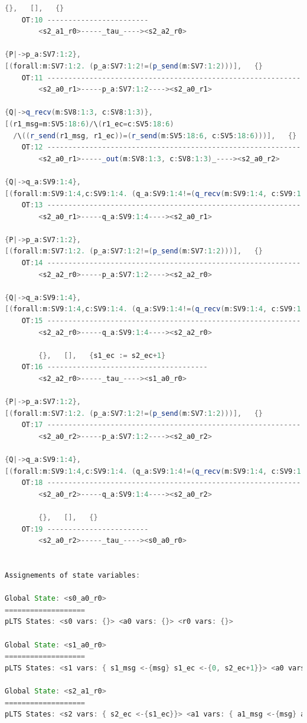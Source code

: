 \begin{lstlisting}[basicstyle=\scriptsize\ttfamily, language=java, frame=single]
		{},   [],   {}
	OT:10 ------------------------
		<s2_a1_r0>-----_tau_----><s2_a2_r0>

{P|->p_a:SV7:1:2},
[(forall:m:SV7:1:2. (p_a:SV7:1:2!=(p_send(m:SV7:1:2)))],   {}
	OT:11 ------------------------------------------------------------
		<s2_a0_r1>-----p_a:SV7:1:2----><s2_a0_r1>

{Q|->q_recv(m:SV8:1:3, c:SV8:1:3)},
[(r1_msg=m:SV5:18:6)/\(r1_ec=c:SV5:18:6)
  /\((r_send(r1_msg, r1_ec))=(r_send(m:SV5:18:6, c:SV5:18:6)))],   {}
	OT:12 ------------------------------------------------------------
		<s2_a0_r1>-----_out(m:SV8:1:3, c:SV8:1:3)_----><s2_a0_r2>

{Q|->q_a:SV9:1:4},
[(forall:m:SV9:1:4,c:SV9:1:4. (q_a:SV9:1:4!=(q_recv(m:SV9:1:4, c:SV9:1:4)))],   {}
	OT:13 ------------------------------------------------------------
		<s2_a0_r1>-----q_a:SV9:1:4----><s2_a0_r1>

{P|->p_a:SV7:1:2},
[(forall:m:SV7:1:2. (p_a:SV7:1:2!=(p_send(m:SV7:1:2)))],   {}
	OT:14 ------------------------------------------------------------
		<s2_a2_r0>-----p_a:SV7:1:2----><s2_a2_r0>

{Q|->q_a:SV9:1:4},
[(forall:m:SV9:1:4,c:SV9:1:4. (q_a:SV9:1:4!=(q_recv(m:SV9:1:4, c:SV9:1:4)))],   {}
	OT:15 ------------------------------------------------------------
		<s2_a2_r0>-----q_a:SV9:1:4----><s2_a2_r0>

		{},   [],   {s1_ec := s2_ec+1}
	OT:16 --------------------------------------
		<s2_a2_r0>-----_tau_----><s1_a0_r0>

{P|->p_a:SV7:1:2},
[(forall:m:SV7:1:2. (p_a:SV7:1:2!=(p_send(m:SV7:1:2)))],   {}
	OT:17 ------------------------------------------------------------
		<s2_a0_r2>-----p_a:SV7:1:2----><s2_a0_r2>

{Q|->q_a:SV9:1:4},
[(forall:m:SV9:1:4,c:SV9:1:4. (q_a:SV9:1:4!=(q_recv(m:SV9:1:4, c:SV9:1:4)))],   {}
	OT:18 ------------------------------------------------------------
		<s2_a0_r2>-----q_a:SV9:1:4----><s2_a0_r2>

		{},   [],   {}
	OT:19 ------------------------
		<s2_a0_r2>-----_tau_----><s0_a0_r0>


Assignements of state variables:

Global State: <s0_a0_r0>
===================
pLTS States: <s0 vars: {}> <a0 vars: {}> <r0 vars: {}>

Global State: <s1_a0_r0>
===================
pLTS States: <s1 vars: { s1_msg <-{msg} s1_ec <-{0, s2_ec+1}}> <a0 vars: {}> <r0 vars: {}>

Global State: <s2_a1_r0>
===================
pLTS States: <s2 vars: { s2_ec <-{s1_ec}}> <a1 vars: { a1_msg <-{msg} a1_ec <-{c}}> <r0 vars: {}>


\end{lstlisting}
